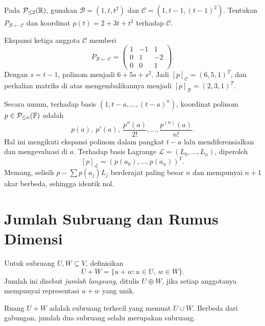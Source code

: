 \begin{exam}
    Pada $\mathcal P_{\le2}(\mathbb{R})$, gunakan
    $\mathcal B=(1,t,t^2)$ dan $\mathcal C=(1,t-1,(t-1)^2)$.
    Tentukan $P_{\mathcal B\leftarrow\mathcal C}$ dan
    koordinat $p(t)=2+3t+t^2$ terhadap $\mathcal C$.
\end{exam}
\begin{solution}
    Ekspansi ketiga anggota $\mathcal C$ memberi
    \[
        P_{\mathcal B\leftarrow\mathcal C}
        =\begin{pmatrix}1&-1&1\\0&1&-2\\0&0&1\end{pmatrix}.
    \]
    Dengan $s=t-1$, polinom menjadi $6+5s+s^2$.
    Jadi $[p]_{\mathcal C}=(6,5,1)^T$, dan perkalian matriks
    di atas mengembalikannya menjadi $[p]_{\mathcal B}=(2,3,1)^T$.
\end{solution}

Secara umum, terhadap basis $(1,t-a,\ldots,(t-a)^n)$,
koordinat polinom $p\in\mathcal P_{\le n}(\mathbb{F})$ adalah
\[
    p(a),\ p'(a),\ \frac{p''(a)}{2!},\ldots,
    \frac{p^{(n)}(a)}{n!}.
\]
Hal ini mengikuti ekspansi polinom dalam pangkat $t-a$ lalu
mendiferensialkan dan mengevaluasi di $a$.
Terhadap basis Lagrange $\mathcal L=(L_0,\ldots,L_n)$, diperoleh
\[
    [p]_{\mathcal L}=(p(a_0),\ldots,p(a_n))^T.
\]
Memang, selisih $p-\sum p(a_j)L_j$ berderajat paling besar $n$ dan mempunyai
$n+1$ akar berbeda, sehingga identik nol.

\section{Jumlah Subruang dan Rumus Dimensi}

\begin{definisi}
    Untuk subruang $U,W\subseteq V$, definisikan
    \[
        U+W=\{u+w:u\in U,\ w\in W\}.
    \]
    Jumlah ini disebut \emph{jumlah langsung}, ditulis $U\oplus W$,
    jika setiap anggotanya mempunyai representasi $u+w$ yang unik.
\end{definisi}

Ruang $U+W$ adalah subruang terkecil yang memuat $U\cup W$.
Berbeda dari gabungan, jumlah dua subruang selalu merupakan subruang.

